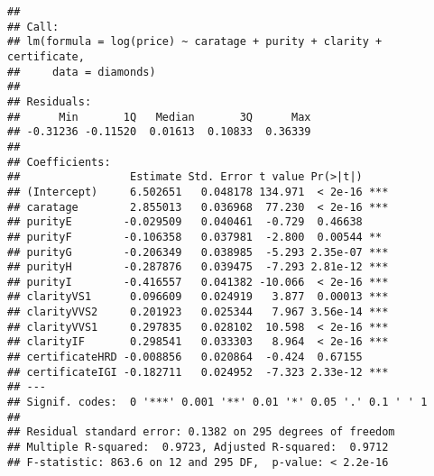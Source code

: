 \documentclass[]{article}
\newenvironment{Shaded}{\begin{snugshade}}{\end{snugshade}}
\newcommand{\KeywordTok}[1]{\textcolor[rgb]{0.13,0.29,0.53}{\textbf{#1}}}
\newcommand{\DataTypeTok}[1]{\textcolor[rgb]{0.13,0.29,0.53}{#1}}
\newcommand{\DecValTok}[1]{\textcolor[rgb]{0.00,0.00,0.81}{#1}}
\newcommand{\StringTok}[1]{\textcolor[rgb]{0.31,0.60,0.02}{#1}}
\newcommand{\CommentTok}[1]{\textcolor[rgb]{0.56,0.35,0.01}{\textit{#1}}}
\newcommand{\OperatorTok}[1]{\textcolor[rgb]{0.81,0.36,0.00}{\textbf{#1}}}
\newcommand{\NormalTok}[1]{#1}
\begin{document}
\begin{verbatim}
## 
## Call:
## lm(formula = log(price) ~ caratage + purity + clarity + certificate, 
##     data = diamonds)
## 
## Residuals:
##      Min       1Q   Median       3Q      Max 
## -0.31236 -0.11520  0.01613  0.10833  0.36339 
## 
## Coefficients:
##                 Estimate Std. Error t value Pr(>|t|)    
## (Intercept)     6.502651   0.048178 134.971  < 2e-16 ***
## caratage        2.855013   0.036968  77.230  < 2e-16 ***
## purityE        -0.029509   0.040461  -0.729  0.46638    
## purityF        -0.106358   0.037981  -2.800  0.00544 ** 
## purityG        -0.206349   0.038985  -5.293 2.35e-07 ***
## purityH        -0.287876   0.039475  -7.293 2.81e-12 ***
## purityI        -0.416557   0.041382 -10.066  < 2e-16 ***
## clarityVS1      0.096609   0.024919   3.877  0.00013 ***
## clarityVVS2     0.201923   0.025344   7.967 3.56e-14 ***
## clarityVVS1     0.297835   0.028102  10.598  < 2e-16 ***
## clarityIF       0.298541   0.033303   8.964  < 2e-16 ***
## certificateHRD -0.008856   0.020864  -0.424  0.67155    
## certificateIGI -0.182711   0.024952  -7.323 2.33e-12 ***
## ---
## Signif. codes:  0 '***' 0.001 '**' 0.01 '*' 0.05 '.' 0.1 ' ' 1
## 
## Residual standard error: 0.1382 on 295 degrees of freedom
## Multiple R-squared:  0.9723, Adjusted R-squared:  0.9712 
## F-statistic: 863.6 on 12 and 295 DF,  p-value: < 2.2e-16
\end{verbatim}

\begin{Shaded}
\end{Shaded}
\end{document}
